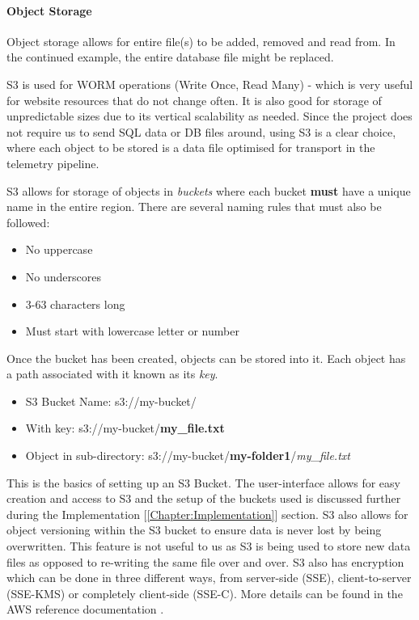 \paragraph{Object Storage}
Object storage allows for entire file(s) to be added, removed and read from. In the continued example, the entire database file might be replaced. 

S3 is used for WORM operations (Write Once, Read Many) - which is very useful for website resources that do not change often. It is also good for storage of unpredictable sizes due to its vertical scalability as needed. Since the project does not require us to send SQL data or DB files around, using S3 is a clear choice, where each object to be stored is a data file optimised for transport in the telemetry pipeline. 

S3 allows for storage of objects in \textit{buckets} where each bucket \textbf{must} have a unique name in the entire region. There are several naming rules that must also be followed:
\begin{itemize}
    \item No uppercase
    \item No underscores
    \item 3-63 characters long
    \item Must start with lowercase letter or number
\end{itemize}
Once the bucket has been created, objects can be stored into it. Each object has a path associated with it known as its \textit{key}.

\begin{itemize}
    \item S3 Bucket Name: s3://my-bucket/
    \item With key: s3://my-bucket/\textbf{my\_file.txt}
    \item Object in sub-directory: s3://my-bucket/\textbf{my-folder1}/\textit{my\_file.txt}
\end{itemize}

This is the basics of setting up an S3 Bucket. The user-interface allows for easy creation and access to S3 and the setup of the buckets used is discussed further during the Implementation [\ref{Chapter:Implementation}] section. S3 also allows for object versioning within the S3 bucket to ensure data is never lost by being overwritten. This feature is not useful to us as S3 is being used to store new data files as opposed to re-writing the same file over and over. S3 also has encryption which can be done in three different ways, from server-side (SSE), client-to-server (SSE-KMS) or completely client-side (SSE-C). More details can be found in the AWS reference documentation \cite{ch1_2_s3_encryption}. 

